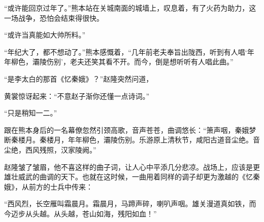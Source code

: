“或许能回京过年了。”熊本站在关城南面的城墙上，叹息着，有了火药为助力，这一场战争，恐怕会结束得很快。

“或许当真能如大帅所料。”

“年纪大了，都不想动了。”熊本感慨着，“几年前老夫奉旨出陇西，听到有人唱‘年年柳色，灞陵伤别’，老夫还笑其看不开。而今，倒是想听听有人唱此曲。”

“是李太白的那首《忆秦娥》？”赵隆突然问道，

黄裳惊讶起来：“不意赵子渐你还懂一点诗词。”

“只是稍知一二。”

跟在熊本身后的一名幕僚忽然引颈高歌，音声苍苍，曲调悠长：“箫声咽，秦娥梦断秦楼月。秦楼月，年年柳色，灞陵伤别。乐游原上清秋节，咸阳古道音尘绝。音尘绝，西风残照，汉家陵阙。”

赵隆皱了皱眉，他不喜这样的曲子词，让人心中平添几分悲凉。战场上，应该是更雄壮威武的曲调的天下。也就在这时候，一曲用着同样的调子却更为激越的《忆秦娥》，从前方的士兵中传来：

“西风烈，长空雁叫霜晨月。霜晨月，马蹄声碎，喇叭声咽。雄关漫道真如铁，而今迈步从头越。从头越，苍山如海，残阳如血！”
